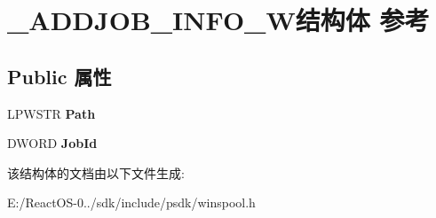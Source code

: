 \hypertarget{struct___a_d_d_j_o_b___i_n_f_o__1_w}{}\section{\+\_\+\+A\+D\+D\+J\+O\+B\+\_\+\+I\+N\+F\+O\+\_\+W结构体 参考}
\label{struct___a_d_d_j_o_b___i_n_f_o__1_w}
\subsection*{Public 属性}
\begin{DoxyCompactItemize}
\item 
\mbox{\label{struct___a_d_d_j_o_b___i_n_f_o__1_w_acf99d3a514a72cfea4a34f5452bc9ac7}} 
L\+P\+W\+S\+TR {\bfseries Path}
\item 
\mbox{\label{struct___a_d_d_j_o_b___i_n_f_o__1_w_a14fe8e70d14cd5380c55f577aff1db7f}} 
D\+W\+O\+RD {\bfseries Job\+Id}
\end{DoxyCompactItemize}


该结构体的文档由以下文件生成\+:\begin{DoxyCompactItemize}
\item 
E\+:/\+React\+O\+S-\/0../sdk/include/psdk/winspool.\+h\end{DoxyCompactItemize}
